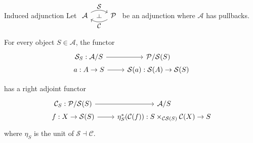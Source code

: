 \documentclass[4pt]{beamer}
\begin{document}
\begin{frame}{Induced adjunction}
    Let $\begin{tikzcd}[every label/.append style = {font = \small}, ampersand replacement=\&]
        \mathcal{A} \arrow[r, bend left, "\mathcal{S}", ""{name=S}] \& \mathcal{P} \arrow[l, bend left, "\mathcal{C}", ""{name=C}] \arrow[phantom, from=S, to=C, "\dashv" rotate=-90]
    \end{tikzcd}$ be an adjunction where $\mathcal{A}$ has pullbacks.
    
    For every object $S\in\mathcal{A}$, the functor
    \[
    \begin{tikzcd}[every label/.append style = {font = \small}, ampersand replacement=\&, row sep=1pt]
        \mathcal{S}_S:{\mathcal{A}}/S \arrow[r] \& {\mathcal{P}}/\mathcal{S}(S) \\
        a:A\to S \arrow[r] \& \mathcal{S}(a):\mathcal{S}(A)\to \mathcal{S}(S)
    \end{tikzcd}
    \]

    \vspace{3mm}
    
    has a right adjoint functor
    \[
    \begin{tikzcd}[every label/.append style = {font = \small}, ampersand replacement=\&, row sep=1pt]
        \mathcal{C}_S:{\mathcal{P}}/\mathcal{S}(S) \arrow[r] \& {\mathcal{A}}/S \\
        f:X\to \mathcal{S}(S) \arrow[r] \& \eta_S^*(\mathcal{C}(f)):S\times_{\mathcal{C}\mathcal{S}(S)}\mathcal{C}(X)\to S
    \end{tikzcd}
    \]
    where $\eta_S$ is the unit of $\mathcal{S}\dashv\mathcal{C}$.
\end{frame}
\end{document}
